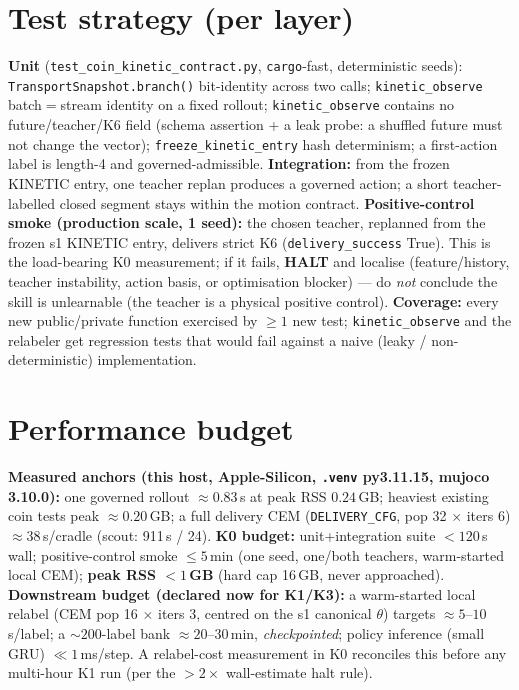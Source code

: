 \documentclass[11pt]{article}
\newcommand{\code}[1]{\texttt{\small #1}}
\newcommand{\halt}{\textcolor{red!70!black}{\textbf{HALT}}}
\begin{document}
\section{Test strategy (per layer)}
\textbf{Unit} (\code{test\_coin\_kinetic\_contract.py}, \code{cargo}-fast, deterministic seeds):
\code{TransportSnapshot.branch()} bit-identity across two calls; \code{kinetic\_observe} batch$=$stream identity on a
fixed rollout; \code{kinetic\_observe} contains no future/teacher/K6 field (schema assertion + a leak probe: a shuffled
future must not change the vector); \code{freeze\_kinetic\_entry} hash determinism; a first-action label is length-4 and
governed-admissible.
\textbf{Integration:} from the frozen KINETIC entry, one teacher replan produces a governed action; a short
teacher-labelled closed segment stays within the motion contract.
\textbf{Positive-control smoke (production scale, 1 seed):} the chosen teacher, replanned from the frozen s1 KINETIC
entry, delivers strict K6 (\code{delivery\_success} True). This is the load-bearing K0 measurement; if it fails, \halt{}
and localise (feature/history, teacher instability, action basis, or optimisation blocker) --- do \emph{not} conclude the
skill is unlearnable (the teacher is a physical positive control).
\textbf{Coverage:} every new public/private function exercised by $\ge 1$ new test; \code{kinetic\_observe} and the
relabeler get regression tests that would fail against a naive (leaky / non-deterministic) implementation.

\section{Performance budget}
\textbf{Measured anchors (this host, Apple-Silicon, \code{.venv} py3.11.15, mujoco 3.10.0):} one governed rollout
$\approx 0.83$\,s at peak RSS $0.24$\,GB; heaviest existing coin tests peak $\approx 0.20$\,GB; a full delivery CEM
(\code{DELIVERY\_CFG}, pop 32 $\times$ iters 6) $\approx 38$\,s/cradle (scout: 911\,s / 24).
\textbf{K0 budget:} unit+integration suite $<120$\,s wall; positive-control smoke $\le 5$\,min (one seed, one/both
teachers, warm-started local CEM); \textbf{peak RSS $< 1$\,GB} (hard cap 16\,GB, never approached).
\textbf{Downstream budget (declared now for K1/K3):} a warm-started local relabel (CEM pop 16 $\times$ iters 3, centred
on the s1 canonical $\theta$) targets $\approx 5$--$10$\,s/label; a $\sim\!200$-label bank $\approx 20$--$30$\,min,
\emph{checkpointed}; policy inference (small GRU) $\ll 1$\,ms/step. A relabel-cost measurement in K0 reconciles this
before any multi-hour K1 run (per the $>2\times$ wall-estimate halt rule).
\end{document}
